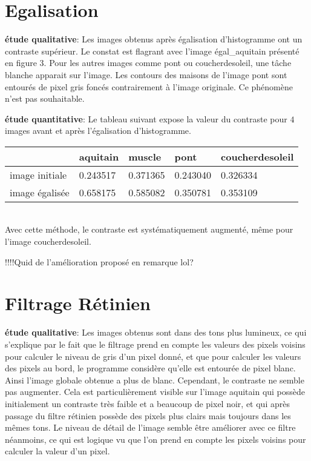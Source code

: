 \documentclass[12pt]{article}
\numberwithin{equation}{section}
\begin{document}
\section{Egalisation}

\textbf{étude qualitative}: Les images obtenus après égalisation d'histogramme ont un contraste supérieur. Le constat est flagrant avec l'image égal\_aquitain présenté en figure 3. Pour les autres images comme pont ou coucherdesoleil, une tâche blanche apparait sur l'image. Les contours des maisons de l'image pont sont entourés de pixel gris foncés contrairement à l'image originale. Ce phénomène n'est pas souhaitable. 

\textbf{étude quantitative}: Le tableau suivant expose la valeur du contraste pour $4$ images avant et après l'égalisation d'histogramme.\\
\begin{tabular}{|l|l|l|l|l|}
\hline
 & aquitain & muscle & pont & coucherdesoleil\\
\hline
image initiale & 0.243517 & 0.371365 & 0.243040 & 0.326334\\
\hline
image égalisée & 0.658175 & 0.585082 & 0.350781 &  0.353109\\
\hline
\end{tabular}\\

Avec cette méthode, le contraste est systématiquement augmenté, même pour l'image coucherdesoleil.

!!!!Quid de l'amélioration proposé en remarque lol?
\section{Filtrage Rétinien}

\textbf{étude qualitative}: Les images obtenus sont dans des tons plus lumineux, ce qui s'explique par le fait que le filtrage prend en compte les valeurs des pixels voisins pour calculer le niveau de gris d'un pixel donné, et que pour calculer les valeurs des pixels au bord, le programme considère qu'elle est entourée de pixel blanc. Ainsi l'image globale obtenue a plus de blanc. Cependant, le contraste ne semble pas augmenter. Cela est particulièrement visible sur l'image aquitain qui possède initialement un contraste très faible et a beaucoup de pixel noir, et qui après passage du filtre rétinien possède des pixels plus clairs mais toujours dans les mêmes tons. Le niveau de détail de l'image semble être améliorer avec ce filtre néanmoins, ce qui est logique vu que l'on prend en compte les pixels voisins pour calculer la valeur d'un pixel.
\end{document}
